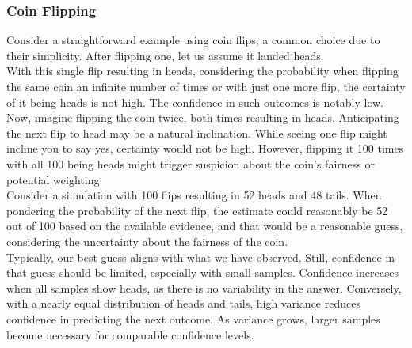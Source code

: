 \documentclass[12pt]{article}
\begin{document}
    \subsubsection{Coin Flipping}
    Consider a straightforward example using coin flips, a common choice due to their simplicity. After flipping one, let us assume it landed heads.\\
    With this single flip resulting in heads, considering the probability when flipping the same coin an infinite number of times or with just one more flip, the certainty of it being heads is not high. The confidence in such outcomes is notably low.\\
    Now, imagine flipping the coin twice, both times resulting in heads. Anticipating the next flip to head may be a natural inclination. While seeing one flip might incline you to say yes, certainty would not be high. However, flipping it 100 times with all 100 being heads might trigger suspicion about the coin's fairness or potential weighting.\\
    Consider a simulation with 100 flips resulting in 52 heads and 48 tails. When pondering the probability of the next flip, the estimate could reasonably be 52 out of 100 based on the available evidence, and that would be a reasonable guess, considering the uncertainty about the fairness of the coin.\\
    Typically, our best guess aligns with what we have observed. Still, confidence in that guess should be limited, especially with small samples. Confidence increases when all samples show heads, as there is no variability in the answer. Conversely, with a nearly equal distribution of heads and tails, high variance reduces confidence in predicting the next outcome. As variance grows, larger samples become necessary for comparable confidence levels.
\end{document}
